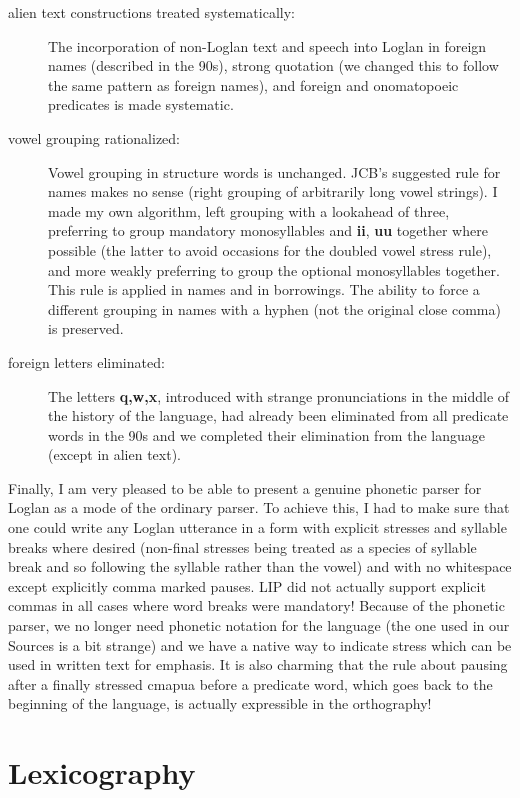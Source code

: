 \documentclass[12pt]{book}
\begin{document}
\begin{description}
\item[alien text constructions treated systematically:]  The incorporation of non-Loglan text and speech into Loglan in foreign names (described in the 90s), strong quotation (we changed this to follow the same pattern as foreign names), and foreign and onomatopoeic predicates is made systematic.

\item[vowel grouping rationalized:]  Vowel grouping in structure words is unchanged.  JCB's suggested rule for names makes no sense (right grouping of arbitrarily long vowel strings).  I made my own algorithm, left grouping with a lookahead of three, preferring to group mandatory monosyllables and {\bf ii}, {\bf uu} together where possible (the latter to avoid occasions for the doubled vowel stress rule), and more weakly preferring to group the optional monosyllables together.  This rule is applied in names and in borrowings.  The ability to force a different grouping in names with a hyphen (not the original close comma) is preserved.

\item[foreign letters eliminated:]  The letters {\bf q,w,x}, introduced with strange pronunciations in the middle of the history of the language, had already been eliminated from all predicate words in the 90s and we completed their elimination from the language (except in alien text).

\end{description}

Finally, I am very pleased to be able to present a genuine phonetic parser for Loglan as a mode of the ordinary parser.  To achieve this, I had to make sure that one could write any Loglan utterance in a form with explicit stresses and syllable breaks where desired (non-final stresses being treated as a species of syllable break and so following the syllable rather than the vowel) and with no whitespace except explicitly comma marked pauses.  LIP did not actually support explicit commas in all cases where word breaks were mandatory!  Because of the phonetic parser, we no longer need phonetic notation for the language (the one used in our Sources is a bit strange) and we have a native way to indicate stress which can be used in written text for emphasis.  It is also charming that the rule about pausing after a finally stressed cmapua before a predicate word, which goes back to the beginning of the language, is actually expressible in the orthography!

\chapter{Lexicography}
\end{document}
